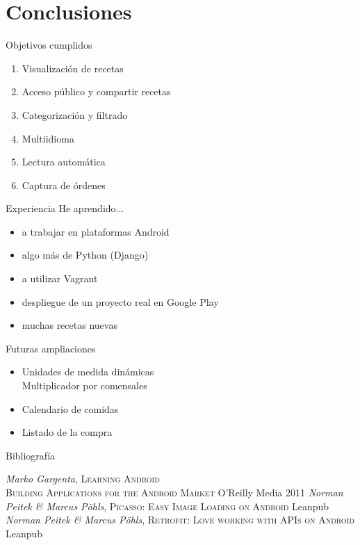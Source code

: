 \documentclass[10pt,xcolor=svgnames]{beamer}
\begin{document}
\section{Conclusiones}

\begin{frame}{Objetivos cumplidos}
  \begin{enumerate}
  \item Visualización de recetas
  \item Acceso público y compartir recetas
  \item Categorización y filtrado
  \item Multiidioma
  \item Lectura automática
  \item Captura de órdenes
  \end{enumerate}  
  
\end{frame}


\begin{frame}{Experiencia}
  He aprendido...
  \begin{itemize}
  \item a trabajar en plataformas Android
  \item algo más de Python (Django)
  \item a utilizar Vagrant
  \item despliegue de un proyecto real en Google Play
  \item muchas recetas nuevas
  \end{itemize}
\end{frame}  


\begin{frame}{Futuras ampliaciones}

  \begin{itemize}
  \item Unidades de medida dinámicas\\
    \then{} Multiplicador por comensales

    \vspace*{0.5cm}
  \item Calendario de comidas

    \vspace*{0.5cm}
  \item Listado de la compra
  \end{itemize}
\end{frame}


\begin{frame}{Bibliografía}

  \begin{thebibliography}{4}
   \textit{Marko Gargenta},
    \newblock \textsc{Learning Android\\Building Applications for the Android
      Market} O'Reilly Media 2011
   \textit{Norman Peitek \& Marcus Pöhls},
    \newblock \textsc{Picasso: Easy Image Loading on Android} Leanpub
   \textit{Norman Peitek \& Marcus Pöhls},
    \newblock \textsc{Retrofit: Love working with APIs on Android} Leanpub
  \end{thebibliography}
\end{frame}
\end{document}
